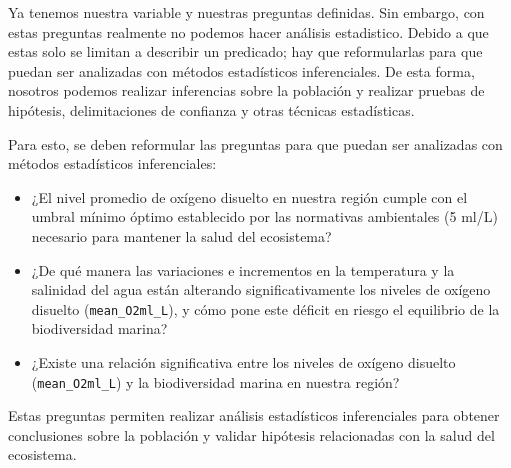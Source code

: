 
Ya tenemos nuestra variable y nuestras preguntas definidas. Sin embargo, con estas preguntas realmente no podemos hacer análisis estadistico. Debido a que estas solo se limitan a describir un predicado; hay que reformularlas para que puedan ser analizadas con métodos estadísticos inferenciales. De esta forma, nosotros podemos realizar inferencias sobre la población y realizar pruebas de hipótesis, delimitaciones de confianza y otras técnicas estadísticas.

Para esto, se deben reformular las preguntas para que puedan ser analizadas con métodos estadísticos inferenciales:

\begin{itemize}
    \item ¿El nivel promedio de oxígeno disuelto en nuestra región cumple con el umbral mínimo óptimo establecido por las normativas ambientales (5 ml/L) necesario para mantener la salud del ecosistema?
    \item ¿De qué manera las variaciones e incrementos en la temperatura y la salinidad del agua están alterando significativamente los niveles de oxígeno disuelto (\texttt{mean\_O2ml\_L}), y cómo pone este déficit en riesgo el equilibrio de la biodiversidad marina?
    \item ¿Existe una relación significativa entre los niveles de oxígeno disuelto (\texttt{mean\_O2ml\_L}) y la biodiversidad marina en nuestra región?
\end{itemize}

Estas preguntas permiten realizar análisis estadísticos inferenciales para obtener conclusiones sobre la población y validar hipótesis relacionadas con la salud del ecosistema.